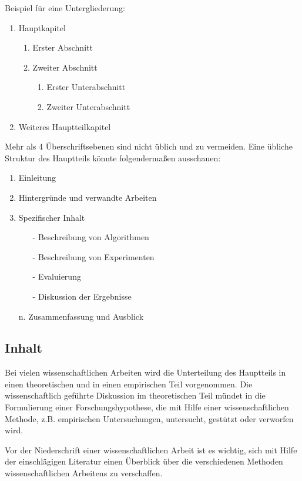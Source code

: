 Beispiel für eine Untergliederung:
%
\begin{enumerate}[label=\arabic*]
  \item Hauptkapitel
  \begin{enumerate}[label=\arabic{enumi}.\arabic*]
    \item Erster Abschnitt
    \item Zweiter Abschnitt
    \begin{enumerate}[label=\arabic{enumi}.\arabic{enumii}.\arabic*]
       \item Erster Unterabschnitt
       \item Zweiter Unterabschnitt
    \end{enumerate}
  \end{enumerate}
  \item Weiteres Hauptteilkapitel
\end{enumerate}
\bigskip

Mehr als 4 Überschriftsebenen sind nicht üblich und zu vermeiden. Eine übliche Struktur des Hauptteils könnte folgendermaßen ausschauen:
\begin{enumerate}
  \item Einleitung
  \item Hintergründe und verwandte Arbeiten
  \item Spezifischer Inhalt
  \begin{itemize}
    \item[-] Beschreibung von Algorithmen
    \item[-] Beschreibung von Experimenten
    \item[-] Evaluierung
    \item[-] Diskussion der Ergebnisse
  \end{itemize}
  \item[n.] Zusammenfassung und Ausblick
\end{enumerate}

\subsection{Inhalt}\label{sec:structure:main:content}
%
Bei vielen wissenschaftlichen Arbeiten wird die Unterteilung des Hauptteils in einen theoretischen und in einen empirischen Teil vorgenommen. Die wissenschaftlich geführte Diskussion im theoretischen Teil mündet in die Formulierung einer Forschungshypothese, die mit Hilfe einer wissenschaftlichen Methode, z.B. empirischen Untersuchungen, untersucht, gestützt oder verworfen wird.

Vor der Niederschrift einer wissenschaftlichen Arbeit ist es wichtig, sich mit Hilfe der einschlägigen Literatur einen Überblick über die verschiedenen Methoden wissenschaftlichen Arbeitens zu verschaffen.


